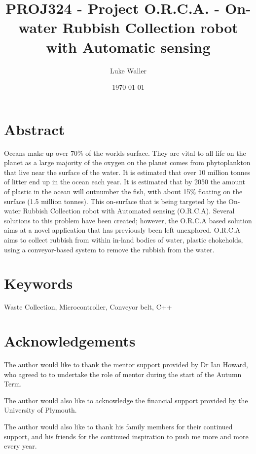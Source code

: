 \documentclass [11pt]{article}
\begin{document}
							
\title{\bf PROJ324 - Project O.R.C.A. - On-water Rubbish Collection robot with Automatic sensing} 	
\author{Luke Waller} 								
\date{\today} 										
\maketitle
\thispagestyle{empty}

\newpage 	

\section*{Abstract}

Oceans make up over 70\% of the worlds surface. They are vital to all life on the planet as a large majority of the oxygen on the planet comes from phytoplankton that live near the surface of the water. It is estimated that over 10 million tonnes of litter end up in the ocean each year. It is estimated that by 2050 the amount of plastic in the ocean will outnumber the fish, with about 15\% floating on the surface (1.5 million tonnes). This on-surface that is being targeted by the On-water Rubbish Collection robot with Automated sensing (O.R.C.A). 
Several solutions to this problem have been created; however, the O.R.C.A based solution aims at a novel application that has previously been left unexplored. O.R.C.A aims to collect rubbish from within in-land bodies of water, plastic chokeholds, using a conveyor-based system to remove the rubbish from the water. 

\section*{Keywords} 
Waste Collection, Microcontroller, Conveyor belt, C++

\newpage
\section*{Acknowledgements}

The author would like to thank the mentor support provided by Dr Ian Howard, who agreed to to undertake the role of mentor during the start of the Autumn Term.

The author would also like to acknowledge the financial support provided by the University of Plymouth. 

The author would also like to thank his family members for their continued support, and his friends for the continued inspiration to push me more and more every year. 							
		
\end{document}
